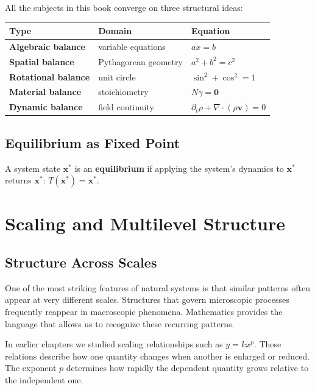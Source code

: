 \documentclass[11pt, openany]{book}
\theoremstyle{plain}
\theoremstyle{definition}
\theoremstyle{remark}
\begin{document}
All the subjects in this book converge on three structural ideas:

\begin{center}
\renewcommand{\arraystretch}{1.6}
\begin{tabular}{>{\bfseries}p{3cm} p{4cm} p{5cm}}
\toprule
\color{ctBlue}Type & \color{ctBlue}Domain & \color{ctBlue}Equation \\
\midrule
Algebraic balance  & variable equations     & $ax=b$ \\
Spatial balance    & Pythagorean geometry   & $a^2+b^2=c^2$ \\
Rotational balance & unit circle            & $\sin^2+\cos^2=1$ \\
Material balance   & stoichiometry          & $N\gamma=\mathbf{0}$ \\
Dynamic balance    & field continuity       & $\partial_t\rho+\nabla\cdot(\rho\mathbf{v})=0$ \\
\bottomrule
\end{tabular}
\end{center}

\section{Equilibrium as Fixed Point}

\begin{mydefinition}[Equilibrium]
A system state $\mathbf{x}^*$ is an \textbf{equilibrium} if applying the
system's dynamics to $\mathbf{x}^*$ returns $\mathbf{x}^*$:
$T(\mathbf{x}^*)=\mathbf{x}^*$.
\end{mydefinition}

\chapter{Scaling and Multilevel Structure}

\section*{Structure Across Scales}

One of the most striking features of natural systems is that similar
patterns often appear at very different scales. Structures that govern
microscopic processes frequently reappear in macroscopic phenomena.
Mathematics provides the language that allows us to recognize these
recurring patterns.

In earlier chapters we studied scaling relationships such as
$y=kx^p$. These relations describe how one quantity changes when another
is enlarged or reduced. The exponent $p$ determines how rapidly the
dependent quantity grows relative to the independent one.
\end{document}

